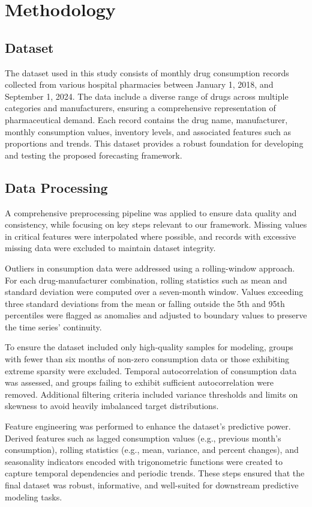 \documentclass[journal]{IEEEtran}
\begin{document}
\section{Methodology}

\subsection{Dataset}
The dataset used in this study consists of monthly drug consumption records collected from various hospital pharmacies between January 1, 2018, and September 1, 2024. The data include a diverse range of drugs across multiple categories and manufacturers, ensuring a comprehensive representation of pharmaceutical demand. Each record contains the drug name, manufacturer, monthly consumption values, inventory levels, and associated features such as proportions and trends. This dataset provides a robust foundation for developing and testing the proposed forecasting framework.

\subsection{Data Processing}
A comprehensive preprocessing pipeline was applied to ensure data quality and consistency, while focusing on key steps relevant to our framework. Missing values in critical features were interpolated where possible, and records with excessive missing data were excluded to maintain dataset integrity.

Outliers in consumption data were addressed using a rolling-window approach. For each drug-manufacturer combination, rolling statistics such as mean and standard deviation were computed over a seven-month window. Values exceeding three standard deviations from the mean or falling outside the 5th and 95th percentiles were flagged as anomalies and adjusted to boundary values to preserve the time series' continuity.

To ensure the dataset included only high-quality samples for modeling, groups with fewer than six months of non-zero consumption data or those exhibiting extreme sparsity were excluded. Temporal autocorrelation of consumption data was assessed, and groups failing to exhibit sufficient autocorrelation were removed. Additional filtering criteria included variance thresholds and limits on skewness to avoid heavily imbalanced target distributions.

Feature engineering was performed to enhance the dataset's predictive power. Derived features such as lagged consumption values (e.g., previous month’s consumption), rolling statistics (e.g., mean, variance, and percent changes), and seasonality indicators encoded with trigonometric functions were created to capture temporal dependencies and periodic trends. These steps ensured that the final dataset was robust, informative, and well-suited for downstream predictive modeling tasks.
\end{document}

